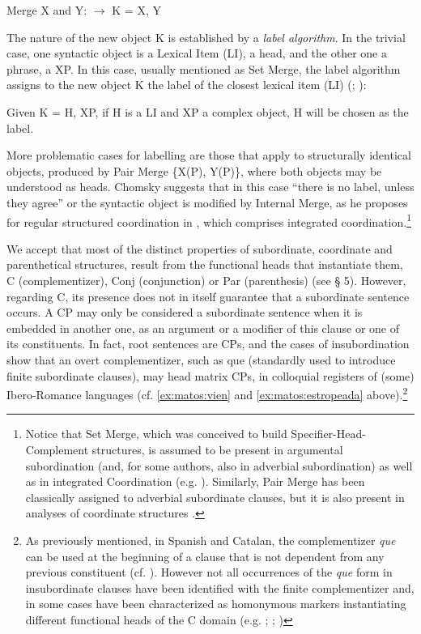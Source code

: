 \documentclass[output=paper,colorlinks,citecolor=brown,
]{langscibook}
\begin{document}
\ea \label{ex:matos:merge-xy}
Merge X and Y: $\xrightarrow{}$ K = {X, Y}
\z

The nature of the new object K is established by a \textit{label algorithm}. In the trivial case, one syntactic object is a Lexical Item (LI), a head, and the other one a phrase, a XP. In this case, usually mentioned as Set Merge, the label algorithm assigns to the new object K the label of the closest lexical item (LI) (\citealt[43]{chomsky_problems_2013}; \citeyear[7]{chomsky_problems_2015}):

\ea \label{ex:matos:given-k}
Given K = {H, XP}, if H is a LI and XP a complex object, H will be chosen as the label.
\z 

More problematic cases for labelling are those that apply to structurally identical objects, produced by Pair Merge \{X(P), Y(P)\}, where both objects may be understood as heads. Chomsky suggests that in this case “there is no label, unless they agree” \citep[7]{chomsky_problems_2015} or the syntactic object is modified by Internal Merge, as he proposes for regular structured coordination in \citet[46]{chomsky_problems_2013}, which comprises integrated coordination.\footnote{Notice that Set Merge, which was conceived to build Specifier-Head-Complement structures, is assumed to be present in argumental subordination (and, for some authors, also in adverbial subordination) as well as in integrated Coordination (e.g. \citealt{johannessen_coordination_1998}). Similarly, Pair Merge has been classically assigned to adverbial subordinate clauses, but it is also present in analyses of coordinate structures \citep{munn_topics_1993}.}

We accept that most of the distinct properties of subordinate, coordinate and parenthetical structures, result from the functional heads that instantiate them, C (complementizer), Conj (conjunction) or Par (parenthesis) (see § 5). However, regarding C, its presence does not in itself guarantee that a subordinate sentence occurs. A CP may only be considered a subordinate sentence when it is embedded in another one, as an argument or a modifier of this clause or one of its constituents. In fact, root sentences are CPs, and the cases of insubordination show that an overt complementizer, such as que (standardly used to introduce finite subordinate clauses), may head matrix CPs, in colloquial registers of (some) Ibero-Romance languages (cf. \ref{ex:matos:vien} and \ref{ex:matos:estropeada} above).\footnote{As previously mentioned, in Spanish and Catalan, the complementizer \textit{que} can be used at the beginning of a clause that is not dependent from any previous constituent (cf. \citealt[113]{gras_revisiting_2016}). However not all occurrences of the \textit{que} form in insubordinate clauses have been identified with the finite complementizer and, in some cases have been characterized as homonymous markers instantiating different functional heads of the C domain (e.g. \citealt{demonte_evidentiality_2014}; \citealt{corr_ibero-romance_2016}; \citeyear{corr_matrix_2018})}
\end{document}
